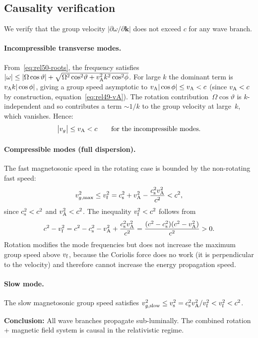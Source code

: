 \subsection{Causality verification}\label{subsec:causality}

\begin{causalitycheck}
We verify that the group velocity $|\partial\omega/\partial\mathbf{k}|$
does not exceed $c$ for any wave branch.

\paragraph{Incompressible transverse modes.}
From~\eqref{eq:rel50-roots}, the frequency satisfies
$|\omega|\leq|\Omega\cos\vartheta|+
\sqrt{\Omega^{2}\cos^{2}\!\vartheta+v_{\mathrm{A}}^{2}k^{2}\cos^{2}\!\phi}$.
For large $k$ the dominant term is $v_{\mathrm{A}} k|\cos\phi|$, giving a group
speed asymptotic to $v_{\mathrm{A}}|\cos\phi|\leq v_{\mathrm{A}}<c$ (since $v_{\mathrm{A}}<c$ by
construction, equation~\eqref{eq:rel49-vA}).  The rotation
contribution~$\Omega\cos\vartheta$ is $k$-independent and so contributes
a term $\sim 1/k$ to the group velocity at large~$k$, which vanishes.
Hence:
\begin{equation}
  \bigl|v_{g}\bigr|
    \leq v_{\mathrm{A}} < c
  \qquad\text{for the incompressible modes.}
  \label{eq:rel50-causality-incomp}
\end{equation}

\paragraph{Compressible modes (full dispersion).}
The fast magnetosonic speed in the rotating case is bounded by the
non-rotating fast speed:
\begin{equation}
  v_{g,\max}^{2}
    \leq v_{\mathrm{f}}^{2}
    = c_{\mathrm{s}}^{2} + v_{\mathrm{A}}^{2} - \frac{c_{\mathrm{s}}^{2}v_{\mathrm{A}}^{2}}{c^{2}}
    < c^{2},
  \label{eq:rel50-causality-comp}
\end{equation}
since $c_{\mathrm{s}}^{2}<c^{2}$ and $v_{\mathrm{A}}^{2}<c^{2}$.  The inequality
$v_{\mathrm{f}}^{2}<c^{2}$ follows from
\begin{equation}
  c^{2}-v_{\mathrm{f}}^{2}
    = c^{2}-c_{\mathrm{s}}^{2}-v_{\mathrm{A}}^{2}+\frac{c_{\mathrm{s}}^{2}v_{\mathrm{A}}^{2}}{c^{2}}
    = \frac{(c^{2}-c_{\mathrm{s}}^{2})(c^{2}-v_{\mathrm{A}}^{2})}{c^{2}} > 0.
  \label{eq:rel50-causality-proof}
\end{equation}
Rotation modifies the mode frequencies but does not increase the
maximum group speed above $v_{\mathrm{f}}$, because the Coriolis force does no work
(it is perpendicular to the velocity) and therefore cannot increase the
energy propagation speed.

\paragraph{Slow mode.}
The slow magnetosonic group speed satisfies
$v_{g,\mathrm{slow}}^{2}\leq v_{\mathrm{s}}^{2}=c_{\mathrm{s}}^{2}v_{\mathrm{A}}^{2}/v_{\mathrm{f}}^{2}<v_{\mathrm{f}}^{2}<c^{2}$.

\medskip
\noindent\textbf{Conclusion:} All wave branches propagate sub-luminally.
The combined rotation + magnetic field system is causal in the
relativistic regime.
\end{causalitycheck}

